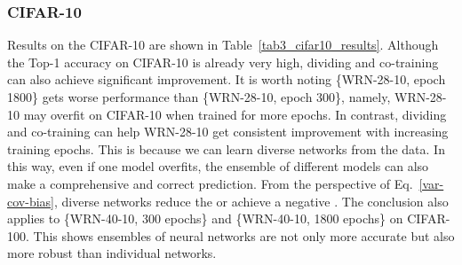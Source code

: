 \documentclass[lettersize,journal]{IEEEtran}
\begin{document}
\subsubsection{CIFAR-10}
Results on the CIFAR-10 are shown in Table~\ref{tab3_cifar10_results}.
Although the Top-1 accuracy on CIFAR-10 is already very high,
dividing and co-training can also achieve significant improvement.
It is worth noting \{WRN-28-10, epoch 1800\} gets worse performance
than \{WRN-28-10, epoch 300\}, namely,
WRN-28-10 may overfit on CIFAR-10 when trained for more epochs.
In contrast, dividing and co-training can help WRN-28-10 get consistent improvement 
with increasing training epochs.
This is because we can learn diverse networks from the data.
In this way, even if one model overfits,
the ensemble of different models can also make a comprehensive and correct prediction.
From the perspective of Eq.~\eqref{var-cov-bias}, diverse networks reduce the 
or achieve a negative .
The conclusion also applies to
\{WRN-40-10, 300 epochs\} and \{WRN-40-10, 1800 epochs\} on CIFAR-100.
This shows ensembles of neural networks are not only more accurate but also
more robust than individual networks. 
\end{document}
